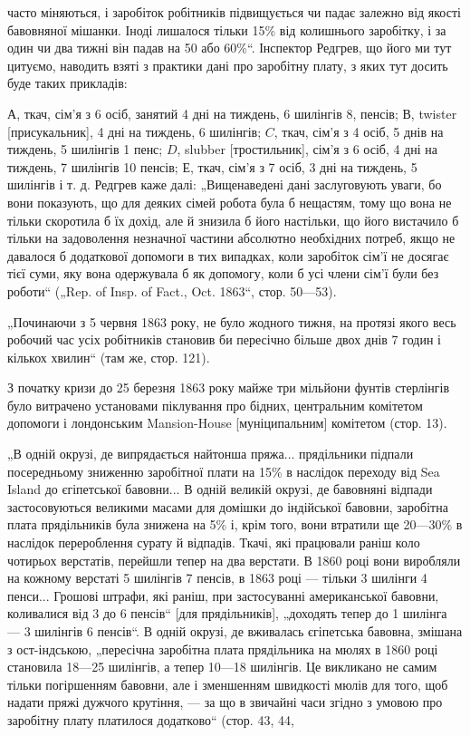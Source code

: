 \parcont{}  %
часто міняються, і заробіток робітників підвищується чи падає
залежно від якості бавовняної мішанки. Іноді лишалося тільки
15\% від колишнього заробітку, і за один чи два тижні він
падав на 50 або 60\%“. Інспектор Редгрев, що його ми тут
цитуємо, наводить взяті з практики дані про заробітну плату,
з яких тут досить буде таких прикладів:

$А$, ткач, сім’я з 6 осіб, занятий 4 дні на тиждень, 6 шилінгів
8, пенсів; $В$, twister [присукальник], 4 дні на тиждень, 6 шилінгів;
$C$, ткач, сім’я з 4 осіб, 5 днів на тиждень, 5 шилінгів
1 пенс; $D$, slubber [тростильник], сім’я з 6 осіб, 4 дні на тиждень,
7 шилінгів 10 пенсів; $Е$, ткач, сім’я з 7 осіб, 3 дні на
тиждень, 5 шилінгів і т. д. Редгрев каже далі: „Вищенаведені
дані заслуговують уваги, бо вони показують, що для деяких
сімей робота була б нещастям, тому що вона не тільки скоротила
б їх дохід, але й знизила б його настільки, що його вистачило
б тільки на задоволення незначної частини абсолютно
необхідних потреб, якщо не давалося б додаткової допомоги
в тих випадках, коли заробіток сім’ї не досягає тієї суми, яку
вона одержувала б як допомогу, коли б усі члени сім’ї були
без роботи“ („Rep. of Insp. of Fact., Oct. 1863“, стор. 50—53).

„Починаючи з 5 червня 1863 року, не було жодного тижня,
на протязі якого весь робочий час усіх робітників становив би
пересічно більше двох днів 7 годин і кількох хвилин“ (там же,
стор. 121).

З початку кризи до 25 березня 1863 року майже три мільйони
фунтів стерлінгів було витрачено установами піклування
про бідних, центральним комітетом допомоги і лондонським
Mansion-House [муніципальним] комітетом (стор. 13).

„В одній окрузі, де випрядається найтонша пряжа... прядільники
підпали посередньому зниженню заробітної плати на 15\%
в наслідок переходу від Sea Island до єгіпетської бавовни...
В одній великій окрузі, де бавовняні відпади застосовуються
великими масами для домішки до індійської бавовни, заробітна
плата прядільників була знижена на 5\% і, крім того, вони
втратили ще 20—30\% в наслідок перероблення сурату й відпадів.
Ткачі, які працювали раніш коло чотирьох верстатів, перейшли
тепер на два верстати. В 1860 році вони виробляли на кожному
верстаті 5 шилінгів 7 пенсів, в 1863 році — тільки 3 шилінги
4 пенси... Грошові штрафи, які раніш, при застосуванні американської
бавовни, коливалися від 3 до 6 пенсів“ [для прядільників],
„доходять тепер до 1 шилінга — 3 шилінгів 6 пенсів“.
В одній окрузі, де вживалась єгіпетська бавовна, змішана
з ост-індською, „пересічна заробітна плата прядільника на мюлях
в 1860 році становила 18—25 шилінгів, а тепер 10—18 шилінгів.
Це викликано не самим тільки погіршенням бавовни,
але і зменшенням швидкості мюлів для того, щоб надати
пряжі дужчого крутіння, — за що в звичайні часи згідно з умовою
про заробітну плату платилося додатково“ (стор. 43, 44,
\parbreak{}  %
